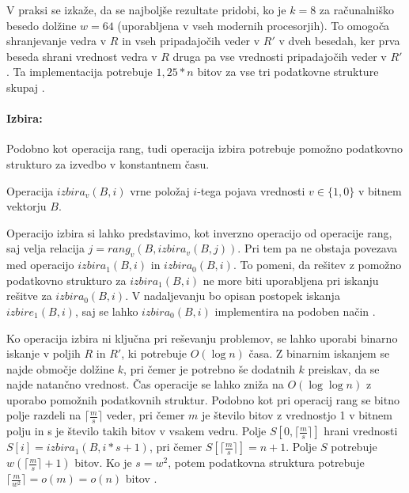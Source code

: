  V praksi se izkaže, da se najboljše rezultate pridobi, ko je $k=8$ za računalniško besedo dolžine $w=64$ (uporabljena v vseh modernih procesorjih). To omogoča shranjevanje vedra v $R$ in vseh pripadajočih veder v $R'$ v dveh besedah, ker prva beseda shrani vrednost vedra v $R$ druga pa vse vrednosti pripadajočih veder v $R'$. Ta implementacija potrebuje $1,25*n$ bitov za vse tri podatkovne strukture skupaj \cite{Navarro2016}.

\paragraph{Izbira:}
Podobno kot operacija rang, tudi operacija izbira potrebuje pomožno podatkovno strukturo za izvedbo v konstantnem času. 
\begin{defi}
    Operacija $izbira_v(B,i)$ vrne položaj $i$-tega pojava vrednosti $v\in\{1,0\}$ v bitnem vektorju $B$.
\end{defi}
Operacijo izbira si lahko predstavimo, kot inverzno operacijo od operacije rang, saj velja relacija $j=rang_v(B,izbira_v(B,j))$. Pri tem pa ne obstaja povezava med operacijo $izbira_1(B,i)$ in $izbira_0(B,i)$. To pomeni, da rešitev z pomožno podatkovno strukturo za $izbira_1(B,i)$ ne more biti uporabljena pri iskanju rešitve za $izbira_0(B,i)$. V nadaljevanju bo opisan postopek iskanja $izbire_1(B,i)$, saj se lahko $izbira_0(B,i)$ implementira na podoben način \cite{Navarro2016}.

Ko operacija izbira ni ključna pri reševanju problemov, se lahko uporabi binarno iskanje v poljih $R$ in $R'$, ki potrebuje $O(\log{n})$ časa. Z binarnim iskanjem se najde območje dolžine $k$, pri čemer je potrebno še dodatnih $k$ preiskav, da se najde natančno vrednost.
Čas operacije se lahko zniža na $O(\log\log n)$ z uporabo pomožnih podatkovnih struktur. Podobno kot pri operacij rang se bitno polje razdeli na $\lceil \frac{m}{s} \rceil$ veder, pri čemer $m$ je število bitov z vrednostjo 1 v bitnem polju in s je število takih bitov v vsakem vedru. Polje $S[0,\lceil \frac{m}{s} \rceil]$ hrani vrednosti $S[i]=izbira_1(B,i*s+1)$, pri čemer $S[\lceil \frac{m}{s} \rceil]=n+1$. Polje $S$ potrebuje $w(\lceil \frac{m}{s} \rceil +1)$ bitov. Ko je $s=w^2$, potem podatkovna struktura potrebuje $\lceil\frac{m}{w^2}\rceil=o(m)=o(n)$ bitov \cite{Navarro2016}.

